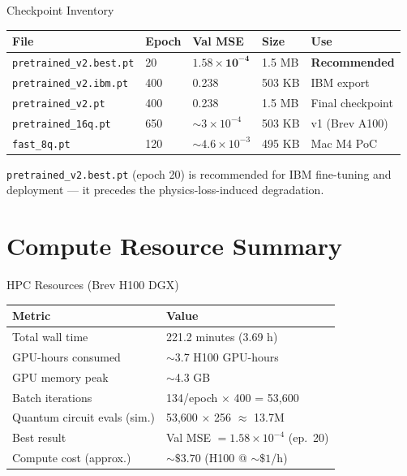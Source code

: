 \documentclass[aspectratio=169]{beamer}
\begin{document}
\begin{frame}{Checkpoint Inventory}
\begin{table}
\centering
\small
\begin{tabular}{lllll}
\toprule
File & Epoch & Val MSE & Size & Use \\
\midrule
\texttt{pretrained\_v2.best.pt} & 20 & $\mathbf{1.58\times10^{-4}}$ & 1.5 MB & \textbf{Recommended} \\
\texttt{pretrained\_v2.ibm.pt} & 400 & 0.238 & 503 KB & IBM export \\
\texttt{pretrained\_v2.pt} & 400 & 0.238 & 1.5 MB & Final checkpoint \\
\texttt{pretrained\_16q.pt} & 650 & $\sim3\times10^{-4}$ & 503 KB & v1 (Brev A100) \\
\texttt{fast\_8q.pt} & 120 & $\sim4.6\times10^{-3}$ & 495 KB & Mac M4 PoC \\
\bottomrule
\end{tabular}
\end{table}

\texttt{pretrained\_v2.best.pt} (epoch 20) is recommended for IBM fine-tuning and deployment --- it precedes the physics-loss-induced degradation.
\end{frame}

\section{Compute Resource Summary}

\begin{frame}{HPC Resources (Brev H100 DGX)}
\begin{table}
\centering
\begin{tabular}{ll}
\toprule
Metric & Value \\
\midrule
Total wall time & 221.2 minutes (3.69 h) \\
GPU-hours consumed & $\sim$3.7 H100 GPU-hours \\
GPU memory peak & $\sim$4.3 GB \\
Batch iterations & 134/epoch $\times$ 400 = 53,600 \\
Quantum circuit evals (sim.) & 53,600 $\times$ 256 $\approx$ 13.7M \\
Best result & Val MSE $=1.58\times10^{-4}$ (ep.\ 20) \\
Compute cost (approx.) & $\sim\$3.70$ (H100 @ $\sim\$1$/h) \\
\bottomrule
\end{tabular}
\end{table}
\end{frame}
\end{document}
